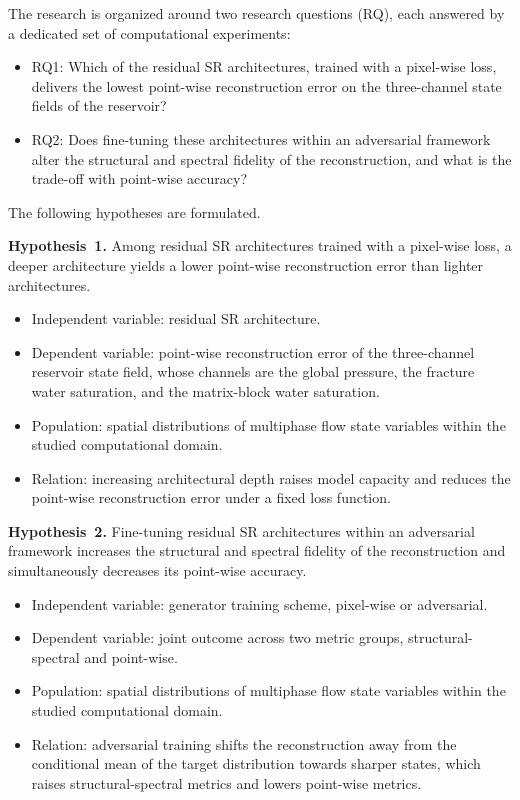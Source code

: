 The research is organized around two research questions (RQ), each answered by a dedicated set of computational experiments:

\begin{itemize}
    \item RQ1: Which of the residual SR architectures, trained with a pixel-wise loss, delivers the lowest point-wise reconstruction error on the three-channel state fields of the reservoir?

    \item RQ2: Does fine-tuning these architectures within an adversarial framework alter the structural and spectral fidelity of the reconstruction, and what is the trade-off with point-wise accuracy?
\end{itemize}

The following hypotheses are formulated.

\textbf{Hypothesis~1.} Among residual SR architectures trained with a pixel-wise loss, a deeper architecture yields a lower point-wise reconstruction error than lighter architectures.

\begin{itemize}
    \item Independent variable: residual SR architecture.
    \item Dependent variable: point-wise reconstruction error of the three-channel reservoir state field, whose channels are the global pressure, the fracture water saturation, and the matrix-block water saturation.
    \item Population: spatial distributions of multiphase flow state variables within the studied computational domain.
    \item Relation: increasing architectural depth raises model capacity and reduces the point-wise reconstruction error under a fixed loss function.
\end{itemize}

\textbf{Hypothesis~2.} Fine-tuning residual SR architectures within an adversarial framework increases the structural and spectral fidelity of the reconstruction and simultaneously decreases its point-wise accuracy.

\begin{itemize}
    \item Independent variable: generator training scheme, pixel-wise or adversarial.
    \item Dependent variable: joint outcome across two metric groups, structural-spectral and point-wise.
    \item Population: spatial distributions of multiphase flow state variables within the studied computational domain.
    \item Relation: adversarial training shifts the reconstruction away from the conditional mean of the target distribution towards sharper states, which raises structural-spectral metrics and lowers point-wise metrics.
\end{itemize}

